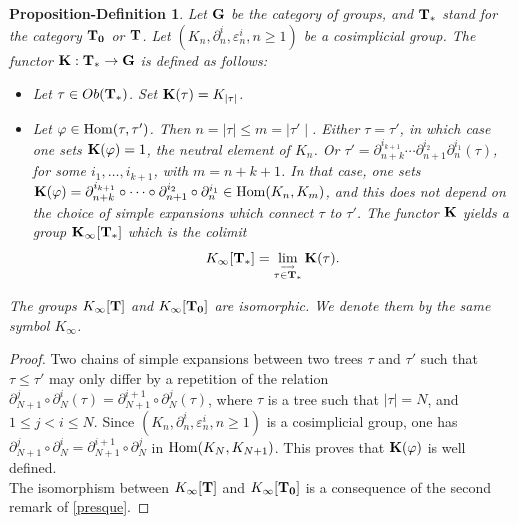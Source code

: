 \documentclass[twoside]{irmaems}
\theoremstyle{plain}
\newtheorem{proposition-definition}[theorem]{Proposition-Definition}
\theoremstyle{definition}
\theoremstyle{remark}
\def\pa{{\partial}}
\begin{document}
\begin{proposition-definition}
Let $\bf G$ be the category of groups, and ${\bf T}_*$ stand for the category ${\bf T_0}$ or ${\bf T}$.
Let  $(K_{n},\pa^{i}_{n}, \varepsilon^{i}_{n},n\geq 1)$ be a cosimplicial group.  
The functor $\bf K:\bf T_*\rightarrow \bf G$ is defined as follows:
\begin{itemize}
\item Let $\tau\in Ob(\bf T_*)$. Set ${\bf K}(\tau)=K_{\mid \tau\mid}$.\\
\item Let $\varphi\in {\rm Hom}(\tau,\tau')$. Then  $n=\mid \tau\mid \leq m=\mid \tau' \mid$.
Either $\tau=\tau'$, in which case one sets ${\bf K}(\varphi)=1$, the neutral element of $K_{n}$. 
Or $\tau'=\partial^{i_{k+1}}_{n+k}\cdots \partial^{i_2}_{n+1} \partial^{i_1}_{n}(\tau)$, for some $i_{1},\ldots, i_{k+1}$,
 with $m=n+k+1$. In that case, one sets ${\bf K}(\varphi)=\partial^{i_{k+1}}_{n+k}\circ\cdots \circ\partial^{i_2}_{n+1} \circ\partial^{i_1}_{n}\in {\rm Hom} (K_{n}, K_{m})$,
 and this does not depend on the choice of simple expansions which connect $\tau$ to $\tau'$.
The functor $\bf K$ yields a  group ${\bf K}_{\infty}[\bf T_*]$ which is the colimit
   $$K_{\infty}[\bf T_*]=\displaystyle \lim_{\stackrel{\longrightarrow}{\tau \in {\bf T_*}}} {\bf K}(\tau).$$
\end{itemize}

\vspace{0.1cm}\noindent 
The groups $K_{\infty}[\bf T]$ and $K_{\infty}[\bf T_0]$ are isomorphic. We denote them by the same symbol $K_{\infty}$.
\end{proposition-definition}

\begin{proof}
Two chains of simple expansions between two trees $\tau$ and $\tau'$ such that $\tau\leq \tau'$
may only differ by a repetition of the relation $\partial^j_{N+1}\circ \partial^{i}_{N}(\tau)=
\partial^{i+1}_{N+1}\circ \partial ^{j}_{N}(\tau)$, where $\tau$ is a tree such that $\mid \tau \mid=N$,  and  $1\leq j<i\leq N$. Since
$(K_{n}, \pa^{i}_{n}, \varepsilon^{i}_{n},n\geq 1)$ is a cosimplicial group, one has $\partial^j_{N+1}\circ \partial^{i}_{N}=
\partial^{i+1}_{N+1}\circ \partial ^{j}_{N}$ in ${\rm Hom}(K_{N},K_{N+1})$. This proves
that ${\bf K}(\varphi)$ is well defined.\\
The isomorphism between $K_{\infty}[\bf T]$ and $K_{\infty}[\bf T_0]$ is a consequence of the second remark of \ref{presque}. 
\end{proof}
\end{document}
